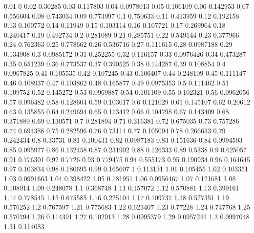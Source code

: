 0.01 0
0.02 0.30285
0.03 0.117803
0.04 0.0978013
0.05 0.106109
0.06 0.142953
0.07 0.556604
0.08 0.743034
0.09 0.773997
0.1 0.750633
0.11 0.413959
0.12 0.192158
0.13 0.100772
0.14 0.11949
0.15 0.103114
0.16 0.107721
0.17 0.269964
0.18 0.240417
0.19 0.492734
0.2 0.281089
0.21 0.285751
0.22 0.549144
0.23 0.377966
0.24 0.762363
0.25 0.778662
0.26 0.536716
0.27 0.111615
0.28 0.0987188
0.29 0.134908
0.3 0.0985172
0.31 0.252255
0.32 0.116157
0.33 0.0976426
0.34 0.473287
0.35 0.651239
0.36 0.773537
0.37 0.390525
0.38 0.144287
0.39 0.108854
0.4 0.0967825
0.41 0.105535
0.42 0.107245
0.43 0.106407
0.44 0.248109
0.45 0.111147
0.46 0.108937
0.47 0.103862
0.48 0.165877
0.49 0.0975353
0.5 0.111462
0.51 0.109752
0.52 0.145272
0.53 0.0969887
0.54 0.101109
0.55 0.102321
0.56 0.0962056
0.57 0.096482
0.58 0.128604
0.59 0.103017
0.6 0.121029
0.61 0.145107
0.62 0.20612
0.63 0.135855
0.64 0.249694
0.65 0.173412
0.66 0.104798
0.67 0.143409
0.68 0.371889
0.69 0.130571
0.7 0.281894
0.71 0.316381
0.72 0.675035
0.73 0.757286
0.74 0.694388
0.75 0.282596
0.76 0.73114
0.77 0.105094
0.78 0.266633
0.79 0.242434
0.8 0.33731
0.81 0.100431
0.82 0.0987183
0.83 0.151636
0.84 0.0994503
0.85 0.095977
0.86 0.132458
0.87 0.231902
0.88 0.126333
0.89 0.5338
0.9 0.625057
0.91 0.776301
0.92 0.7726
0.93 0.779475
0.94 0.555173
0.95 0.190934
0.96 0.164645
0.97 0.103834
0.98 0.180695
0.99 0.165607
1 0.113131
1.01 0.105455
1.02 0.103351
1.03 0.0991663
1.04 0.398422
1.05 0.181951
1.06 0.0956467
1.07 0.121681
1.08 0.108914
1.09 0.248078
1.1 0.368748
1.11 0.157072
1.12 0.570881
1.13 0.399161
1.14 0.778545
1.15 0.675585
1.16 0.225104
1.17 0.109737
1.18 0.527351
1.19 0.576252
1.2 0.767597
1.21 0.775683
1.22 0.623407
1.23 0.77228
1.24 0.747768
1.25 0.570794
1.26 0.114391
1.27 0.102913
1.28 0.0995379
1.29 0.0957241
1.3 0.0997048
1.31 0.114083
